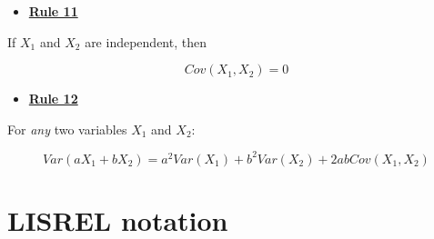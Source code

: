 \documentclass[
]{book}
\providecommand{\tightlist}{%
  \setlength{\itemsep}{0pt}\setlength{\parskip}{0pt}}
\begin{document}
\begin{itemize}
\tightlist
\item
  \href{./covariance.html\#Rule11}{\textbf{Rule 11}}
\end{itemize}

If \(X_{1}\) and \(X_{2}\) are independent, then

\[
Cov\left(X_{1}, X_{2}\right) = 0
\]

\begin{itemize}
\tightlist
\item
  \href{./covariance.html\#Rule12}{\textbf{Rule 12}}
\end{itemize}

For \emph{any} two variables \(X_{1}\) and \(X_{2}\):

\[
Var(aX_{1} + bX_{2}) = 
    a^2Var(X_{1}) + b^2Var(X_{2}) + 2abCov(X_{1}, X_{2})
\]

\hypertarget{appendix-lisrel}{%
\chapter{LISREL notation}\label{appendix-lisrel}}

  
\end{document}
